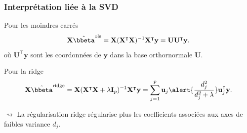 \documentclass{beamer}\usepackage[]{graphicx}\usepackage[]{color}
\begin{document}
\begin{frame}
  \frametitle{Interprétation liée à la SVD}

  \begin{block}{Pour les moindres carrés}
    \begin{equation*}
      \mathbf{X}\hat{\bbeta}^{\text{ols}}                               =
      \mathbf{X}(\mathbf{X}^\intercal\mathbf{X})^{-1}          \mathbf{X}^\intercal
      \mathbf{y} = \mathbf{U} \mathbf{U}^\intercal \mathbf{y}.
    \end{equation*}
    où $\mathbf{U}^\intercal \mathbf{y}$ sont les coordonnées de 
    $\mathbf{y}$ dans la base orthornormale $\mathbf{U}$.
  \end{block}

  \vfill

  \begin{block}{Pour la ridge}
    \begin{equation*}
      \mathbf{X}\hat{\bbeta}^{\text{ridge}}                               =
      \mathbf{X}(\mathbf{X}^\intercal\mathbf{X}                         +
      \lambda\mathbf{I}_p)^{-1} \mathbf{X}^\intercal
      \mathbf{y} = \sum_{j=1}^p \mathbf{u}_j \alert{\frac{d^2_j}{d^2_j+\lambda}}
      \mathbf{u}_j^\intercal \mathbf{y}.
    \end{equation*}
  \end{block}

  $\rightsquigarrow$ La régularisation ridge régularise plus les coefficients associées aux axes de faibles variance  $d_j$.

\end{frame}
\end{document}
